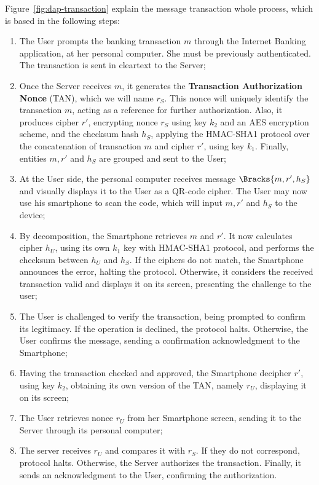 Figure~\ref{fig:dap-transaction} explain the message transaction whole process, which is based in the following steps:

\begin{enumerate}
  \item The User prompts the banking transaction \(m\) through the Internet Banking application, at her personal computer. She must be previously authenticated. The transaction is sent in cleartext to the Server;

  \item Once the Server receives \(m\), it generates the \textbf{Transaction Authorization Nonce} (TAN), which we will name \(r_S\). This nonce will uniquely identify the transaction \(m\), acting as a reference for further authorization. Also, it produces cipher \(r'\), encrypting nonce \(r_S\) using key \(k_2\) and an AES encryption scheme, and the checksum hash \(h_S\), applying the HMAC-SHA1 protocol over the concatenation of transaction \(m\) and cipher \(r'\), using key \(k_1\). Finally, entities \(m, r'\) and \(h_S\) are grouped and sent to the User;

  \item At the User side, the personal computer receives message \(\Bracks{m, r', h_S}\) and visually displays it to the User as a QR-code cipher. The User may now use his smartphone to scan the code, which will input \(m, r'\) and \(h_S\) to the device;

  \item By decomposition, the Smartphone retrieves \(m\) and \(r'\). It now calculates cipher \(h_U\), using its own \(k_1\) key with HMAC-SHA1 protocol, and performs the checksum between \(h_U\) and \(h_S\). If the ciphers do not match, the Smartphone announces the error, halting the protocol. Otherwise, it considers the received transaction valid and displays it on its screen, presenting the challenge to the user;

  \item The User is challenged to verify the transaction, being prompted to confirm its legitimacy. If the operation is declined, the protocol halts. Otherwise, the User confirms the message, sending a confirmation acknowledgment to the Smartphone;

  \item Having the transaction checked and approved, the Smartphone decipher \(r'\), using key \(k_2\), obtaining its own version of the TAN, namely \(r_U\), displaying it on its screen;

  \item The User retrieves nonce \(r_U\) from her Smartphone screen, sending it to the Server through its personal computer;

  \item The server receives \(r_U\) and compares it with \(r_S\). If they do not correspond, protocol halts. Otherwise, the Server authorizes the transaction. Finally, it sends an acknowledgment to the User, confirming the authorization.
\end{enumerate}


